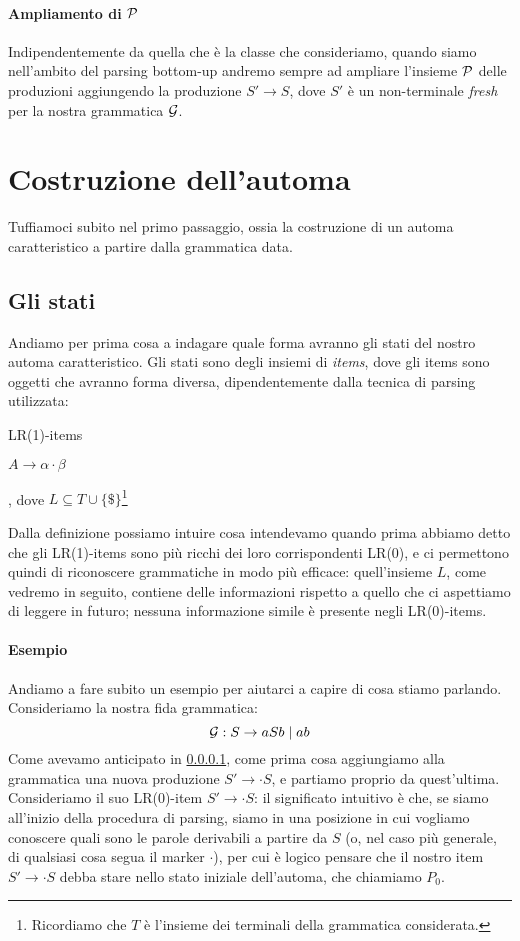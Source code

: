 \documentclass[class=book, crop=false, oneside, 12pt]{standalone}
\begin{document}
\paragraph{Ampliamento di \(\P\)}
\label{par:p-newprod}
 Indipendentemente da quella che è la classe che consideriamo, quando siamo nell'ambito del parsing bottom-up andremo sempre ad ampliare l'insieme \(\P\) delle produzioni aggiungendo la produzione \(S' \to S\), dove \(S'\) è un non-terminale \emph{fresh} per la nostra grammatica \(\G\).

\section{Costruzione dell'automa}
Tuffiamoci subito nel primo passaggio, ossia la costruzione di un automa caratteristico a partire dalla grammatica data.

\subsection{Gli stati}
Andiamo per prima cosa a indagare quale forma avranno gli stati del nostro automa caratteristico. Gli stati sono degli insiemi di \emph{items}, dove gli items sono oggetti che avranno forma diversa, dipendentemente dalla tecnica di parsing utilizzata:
\begin{labeling}{LR(1)-items}
    \item[LR(0)-items] \(A \to \alpha \cdot \beta\)
    \item[LR(1)-items] [\(A \to \alpha \cdot \beta, L\)], dove \(L \subseteq T \cup \{\$\}\)\footnote{Ricordiamo che \(T\) è l'insieme dei terminali della grammatica considerata.}
\end{labeling}
Dalla definizione possiamo intuire cosa intendevamo quando prima abbiamo detto che gli LR(1)-items sono più ricchi dei loro corrispondenti LR(0), e ci permettono quindi di riconoscere grammatiche in modo più efficace: quell'insieme \(L\), come vedremo in seguito, contiene delle informazioni rispetto a quello che ci aspettiamo di leggere in futuro; nessuna informazione simile è presente negli LR(0)-items.

\paragraph{Esempio}
Andiamo a fare subito un esempio per aiutarci a capire di cosa stiamo parlando. Consideriamo la nostra fida grammatica:
\begin{equation}
    \label{eq:balanced}
    \G: S \to aSb \mid ab
\end{equation}
Come avevamo anticipato in \ref{par:p-newprod}, come prima cosa aggiungiamo alla grammatica una nuova produzione \(S' \to \cdot S\), e partiamo proprio da quest'ultima. Consideriamo il suo LR(0)-item \(S' \to \cdot S\): il significato intuitivo è che, se siamo all'inizio della procedura di parsing, siamo in una posizione in cui vogliamo conoscere quali sono le parole derivabili a partire da \(S\) (o, nel caso più generale, di qualsiasi cosa segua il marker \(\cdot\)), per cui è logico pensare che il nostro item \(S' \to \cdot S\) debba stare nello stato iniziale dell'automa, che chiamiamo \(P_0\).
\end{document}
